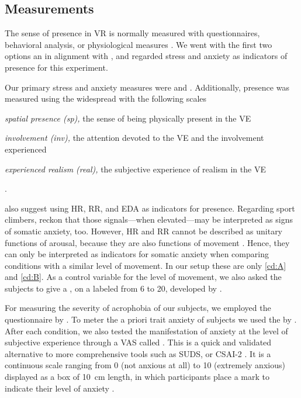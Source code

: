 

\subsection{Measurements} 
\label{sec:study-measurements}

The sense of presence in \gls{VR} is normally measured with questionnaires, behavioral analysis, or physiological measures \autocite[]{Slater2007}. We went with the first two options an in alignment with \textcite{Slater2007,Slater2004a}, and regarded stress and anxiety as indicators of presence for this experiment.



Our primary stress and anxiety measures were  \autocite{Castaldo2015, Hynynen2009} and  \autocite{Brouwer2014,Meehan2001}. Additionally, presence was measured using the widespread  with the following scales 
\begin{inlinelist}
	\item \textit{spatial presence (sp),} the sense of being physically present in the VE
	\item \textit{involvement (inv),} the attention devoted to the VE and the involvement experienced
	\item \textit{experienced realism (real),} the subjective experience of realism in the VE 
\end{inlinelist} \autocite{IPQ2016,VanBaren2004}.

\textcite{Meehan2001} also suggest using \gls{HR}, \gls{RR}, and \gls{EDA} as indicators for presence. Regarding sport climbers, \textcite{Hardy2007} reckon that those signals---when elevated---may be interpreted as signs of somatic anxiety, too. However, \gls{HR} and \gls{RR} cannot be described as unitary functions of arousal, because they are also functions of movement \autocites{Croft2004}[based on][]{Obrist1981}. Hence, they can only be interpreted as indicators for somatic anxiety when comparing conditions with a similar level of movement. In our setup these are only \ref{cd:A} and \ref{cd:B}. As a control variable for the level of movement, we also asked the subjects to give a , on a labeled  from 6 to 20, developed by \textcite{Borg2004}.

 For measuring the severity of acrophobia of our subjects, we employed the  questionnaire by \textcite{Huppert2017}. To meter the a priori trait anxiety of subjects we used the  by \textcite{Grimm2009}. After each condition, we also tested the manifestation of anxiety at the level of subjective experience through a \gls{VAS} called  \autocites{Houtman1989}[also called fear thermometer by][]{Antony2005}. This is a quick and validated alternative to more comprehensive tools such as \gls{SUDS}, or \gls{CSAI-2} \autocite{Pijpers2006}. It is a continuous scale ranging from 0 (not anxious at all) to 10 (extremely anxious) displayed as a box of \SI{10}{\centi\meter} length, in which participants place a mark to indicate their level of anxiety \autocite{Houtman1989}.

